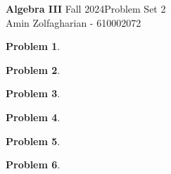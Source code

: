 \documentclass[12pt]{article}
\newcommand{\customanswer}[1]{%
\begin{problem}
\end{problem}

}
\newtheorem{problem}{Problem}
\begin{document}
\noindent \textbf{Algebra III} Fall 2024\hfill Problem Set 2\\
Amin Zolfagharian - 610002072

\hrulefill

\customanswer{1}
\customanswer{2}
\newpage
\customanswer{3}
\customanswer{4}
\customanswer{5}
\customanswer{6}
\end{document}
